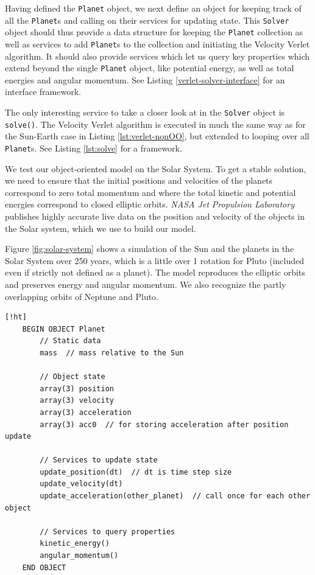\documentclass[]{article}
\begin{document}
Having defined the \lstinline|Planet| object, we next define an object for keeping track of all the \lstinline|Planet|s and calling on their services for updating state. This \lstinline|Solver| object should thus provide a data structure for keeping the \lstinline|Planet| collection as well as services to add \lstinline|Planet|s to the collection and initiating the Velocity Verlet algorithm. It should also provide services which let us query key properties which extend beyond the single \lstinline|Planet| object, like potential energy, as well as total energies and angular momentum. See Listing \ref{verlet-solver-interface} for an interface framework.

The only interesting service to take a closer look at in the \lstinline|Solver| object is \lstinline|solve()|. The Velocity Verlet algorithm is executed in much the same way as for the Sun-Earth case in Listing \ref{lst:verlet-nonOO}, but extended to looping over all \lstinline|Planet|s. See Listing \ref{lst:solve} for a framework.

We test our object-oriented model on the Solar System. To get a stable solution, we need to ensure that the initial positions and velocities of the planets correspond to zero total momentum and where the total kinetic and potential energies correspond to closed elliptic orbits. \textit{NASA Jet Propulsion Laboratory} \cite{nasa-jpl} publishes highly accurate live data on the position and velocity of the objects in the Solar system, which we use to build our model. 

Figure \ref{fig:solar-system} shows a simulation of the Sun and the planets in the Solar System over 250 years, which is a little over 1 rotation for Pluto (included even if strictly not defined as a planet). The model reproduces the elliptic orbits and preserves energy and angular momentum. We also recognize the partly overlapping orbits of Neptune and Pluto.

\begin{lstlisting}[caption={Planet object interface for Velocity Verlet algorithm solving the $n$-body problem.},label={lst:verlet-planet-interface}] [!ht]
	BEGIN OBJECT Planet
		// Static data
		mass  // mass relative to the Sun
		
		// Object state
		array(3) position
		array(3) velocity
		array(3) acceleration
		array(3) acc0  // for storing acceleration after position update
		
		// Services to update state
		update_position(dt)  // dt is time step size
		update_velocity(dt)  
		update_acceleration(other_planet)  // call once for each other object
		
		// Services to query properties
		kinetic_energy()
		angular_momentum()
	END OBJECT
\end{lstlisting}
\end{document}
